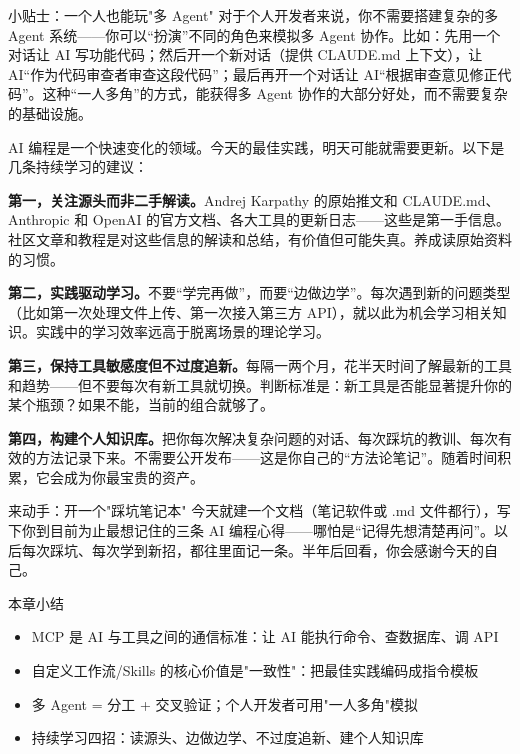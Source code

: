 \begin{tcbinfo}{小贴士：一个人也能玩"多 Agent"}
对于个人开发者来说，你不需要搭建复杂的多 Agent 系统——你可以“扮演”不同的角色来模拟多 Agent 协作。比如：先用一个对话让 AI 写功能代码；然后开一个新对话（提供 CLAUDE.md 上下文），让 AI“作为代码审查者审查这段代码”；最后再开一个对话让 AI“根据审查意见修正代码”。这种“一人多角”的方式，能获得多 Agent 协作的大部分好处，而不需要复杂的基础设施。

\end{tcbinfo}


AI 编程是一个快速变化的领域。今天的最佳实践，明天可能就需要更新。以下是几条持续学习的建议：

\textbf{第一，关注源头而非二手解读。}Andrej Karpathy 的原始推文和 CLAUDE.md、Anthropic 和 OpenAI 的官方文档、各大工具的更新日志——这些是第一手信息。社区文章和教程是对这些信息的解读和总结，有价值但可能失真。养成读原始资料的习惯。

\textbf{第二，实践驱动学习。}不要“学完再做”，而要“边做边学”。每次遇到新的问题类型（比如第一次处理文件上传、第一次接入第三方 API），就以此为机会学习相关知识。实践中的学习效率远高于脱离场景的理论学习。

\textbf{第三，保持工具敏感度但不过度追新。}每隔一两个月，花半天时间了解最新的工具和趋势——但不要每次有新工具就切换。判断标准是：新工具是否能显著提升你的某个瓶颈？如果不能，当前的组合就够了。

\textbf{第四，构建个人知识库。}把你每次解决复杂问题的对话、每次踩坑的教训、每次有效的方法记录下来。不需要公开发布——这是你自己的“方法论笔记”。随着时间积累，它会成为你最宝贵的资产。

\begin{tcbpractice}{来动手：开一个"踩坑笔记本"}
今天就建一个文档（笔记软件或 .md 文件都行），写下你到目前为止最想记住的三条 AI 编程心得——哪怕是“记得先想清楚再问”。以后每次踩坑、每次学到新招，都往里面记一条。半年后回看，你会感谢今天的自己。

\end{tcbpractice}

\begin{tcbsummary}{本章小结}
\begin{itemize}
  \item MCP 是 AI 与工具之间的通信标准：让 AI 能执行命令、查数据库、调 API
  \item 自定义工作流/Skills 的核心价值是"一致性"：把最佳实践编码成指令模板
  \item 多 Agent = 分工 + 交叉验证；个人开发者可用"一人多角"模拟
  \item 持续学习四招：读源头、边做边学、不过度追新、建个人知识库
\end{itemize}

\end{tcbsummary}
